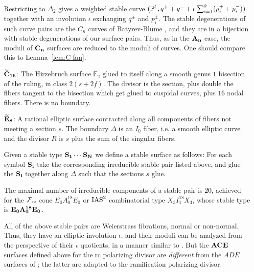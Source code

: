 \documentclass[table,x11names]{amsart}
\begin{document}
\begin{definition}
Restricting to $\Delta_2$ gives a weighted stable
curve $({\mathbb P}^1, q^+ + q^- + \epsilon \sum_{i=1}^k (p_i^+ + p_i^-))$
together with an involution $\iota$ exchanging $q^\pm$ and
$p_i^\pm$. The stable degenerations of such curve pairs are the
$C_n$ curves of Batyrev-Blume \cite{batyrev2011on-generalizations}, and
they are in a bijection with stable degenerations of our surface
pairs. Thus, as in the ${\bf A_n}$ case, the moduli of ${\bf C_n}$ surfaces are
reduced to the moduli of curves.
One should compare this to Lemma~\ref{lem:C-fan}.

\smallskip
${\bf \widetilde{C}_{16}}$: The Hirzebruch surface $\mathbb{F}_2$ glued to itself
along a smooth genus $1$ bisection of the ruling, in class $2(s+2f)$. The divisor
is the section, plus double the fibers tangent to the bisection
which get glued to cuspidal curves, plus $16$ nodal fibers. There is
no boundary.

\smallskip
${\bf \widetilde{E}_8}$: A rational elliptic surface contracted along
 all components of fibers not meeting a section $s$. The boundary $\Delta$ is an
$I_0$ fiber, i.e. a smooth elliptic curve and the divisor $R$ is
$s$ plus the sum of the singular fibers. 

\smallskip
Given a stable type ${\bf S_1}\cdots {\bf S_N}$
we define a stable surface as follows: For each symbol
${\bf S_i}$ take the corresponding irreducible stable pair listed
above, and glue the ${\bf S_i}$ together along $\Delta$ such that
the sections $s$ glue.
\end{definition}

\begin{remark}
  The maximal number of irreducible components of a stable pair
  is $20$, achieved for the ${\mathcal F}_{\rm rc}$ cone $E_0A_0^{18}E_0$ or
  $\operatorname{IAS}^2$ combinatorial type
  $X_3I_1^{18}X_3$, whose stable type is
  ${\bf E_0A_0^{18}E_0}$. 
\end{remark}

\begin{warning}
  All of the above stable pairs are Weierstrass fibrations, normal or
  non-normal. Thus, they have an elliptic involution $\iota$, and their moduli
  can be analyzed from the perspective of their $\iota$ quotients, in
  a manner similar to \cite{alexeev17ade-surfaces}.
  But the ${\bf ACE}$ surfaces defined above for the rc
  polarizing divisor are \emph{different} from the $ADE$ surfaces of
  \cite{alexeev17ade-surfaces}; the latter are adapted to the ramification
  polarizing divisor.
\end{warning} 
\end{document}
